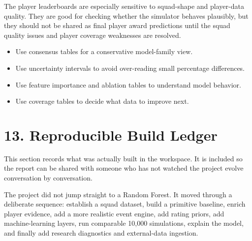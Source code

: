 \documentclass[10pt]{article}
\begin{document}
The player leaderboards are especially sensitive to squad-shape and player-data quality. They are good for checking whether the simulator behaves plausibly, but they should not be shared as final player award predictions until the squad quality issues and player coverage weaknesses are resolved.

\begin{itemize}
  \item Use consensus tables for a conservative model-family view.
  \item Use uncertainty intervals to avoid over-reading small percentage differences.
  \item Use feature importance and ablation tables to understand model behavior.
  \item Use coverage tables to decide what data to improve next.
\end{itemize}

\section{13. Reproducible Build Ledger}

This section records what was actually built in the workspace. It is included so the report can be shared with someone who has not watched the project evolve conversation by conversation.

The project did not jump straight to a Random Forest. It moved through a deliberate sequence: establish a squad dataset, build a primitive baseline, enrich player evidence, add a more realistic event engine, add rating priors, add machine-learning layers, run comparable 10,000 simulations, explain the model, and finally add research diagnostics and external-data ingestion.
\end{document}
